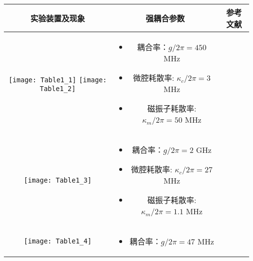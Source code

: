 \begin{center}
	\label{ExperimentsTable}
	\begin{tabular}{ccc}
		\toprule
		实验装置及现象 & 强耦合参数 & 参考文献 \\
		\midrule
		\begin{minipage}[m]{.3\textwidth}\centering\vspace*{5pt}
			\texttt{[image: Table1\_1]}
			\texttt{[image: Table1\_2]}\vspace*{5pt}
		\end{minipage} &
		\begin{minipage}[m]{.5\textwidth}
			\begin{itemize}
				\item 耦合率：$g/2\pi=450$ MHz
				\item 微腔耗散率: $\kappa_c /2\pi=3$ MHz
				\item 磁振子耗散率: $\kappa_m /2\pi=50$ MHz
			\end{itemize}
		\end{minipage} &
		\parencite{PhysRevLett.111.127003Huebl} \\
		\hline
		\begin{minipage}[m]{.3\textwidth}\centering\vspace*{5pt}
			\texttt{[image: Table1\_3]}\vspace*{5pt}
		\end{minipage} &
		\begin{minipage}[m]{.5\textwidth}
			\begin{itemize}
				\item 耦合率：$g/2\pi=2$ GHz
				\item 微腔耗散率: $\kappa_c /2\pi=27$ MHz
				\item 磁振子耗散率: $\kappa_m /2\pi=1.1$ MHz
			\end{itemize}
		\end{minipage} &
		\parencite{PhysRevApplied.2.054002Tobar} \\
		\hline
		\begin{minipage}[m]{.3\textwidth}\centering\vspace*{5pt}
			\texttt{[image: Table1\_4]}\vspace*{5pt}
		\end{minipage} &
		\begin{minipage}[m]{.5\textwidth}
			\begin{itemize}
				\item 耦合率：$g/2\pi=47$ MHz

\end{itemize}
\end{minipage}
\end{tabular}
\end{center}
